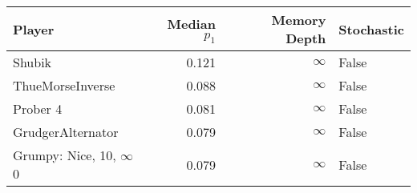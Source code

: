 \begin{tabular}{lrrl}
\toprule
                Player &  Median $p_1$ &  Memory Depth & Stochastic \\
\midrule
                Shubik &         0.121 &            \(\infty\) &      False \\
      ThueMorseInverse &         0.088 &            \(\infty\) &      False \\
              Prober 4 &         0.081 &            \(\infty\) &      False \\
     GrudgerAlternator &         0.079 &            \(\infty\) &      False \\
 Grumpy: Nice, 10, \(\infty\)0 &         0.079 &            \(\infty\) &      False \\
\bottomrule
\end{tabular}

